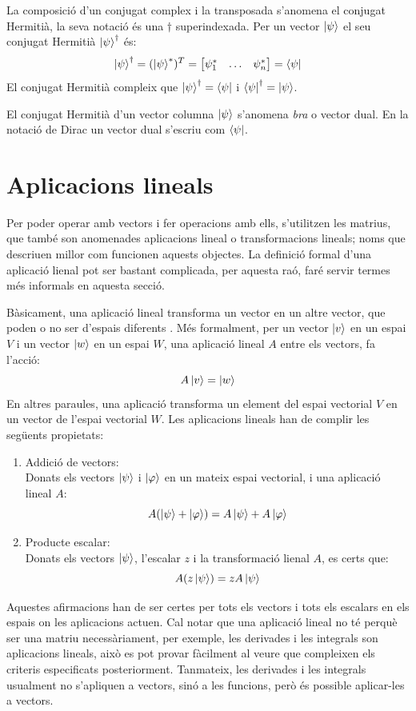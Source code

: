 La composició d'un conjugat complex i la transposada s'anomena el conjugat Hermitià, la seva notació és una $\dagger$ superindexada. Per un vector $\ket{\psi}$ el seu conjugat Hermitià $\ket{\psi}^\dagger$ és:
$$
\ket{\psi}^\dagger = (\ket{\psi}^*)^T =  \begin{bmatrix} \psi_{1}^* & \dots & \psi_{n}^* \end{bmatrix} = \bra{\psi}
$$
El conjugat Hermitià compleix que $\ket{\psi}^\dagger = \bra{\psi}$ i $\bra{\psi}^\dagger = \ket{\psi}$.

El conjugat Hermitià d'un vector columna $\ket{\psi}$ s'anomena \textit{bra} o vector dual. En la notació de Dirac un vector dual s'escriu com $\bra{\psi}$.

\section{Aplicacions lineals}
Per poder operar amb vectors i fer operacions amb ells, s'utilitzen les matrius, que també son anomenades aplicacions lineal o transformacions lineals; noms que descriuen millor com funcionen aquests objectes. La definició formal d'una aplicació lienal pot ser bastant complicada, per aquesta raó, faré servir termes més informals en aquesta secció. 

Bàsicament, una aplicació lineal transforma un vector en un altre vector, que poden o no ser d'espais diferents \cite{LR_done_right:linear_map}. Més formalment, per un vector $\ket{v}$ en un espai $V$ i un vector $\ket{w}$ en un espai $W$, una aplicació lineal $A$ entre els vectors, fa l'acció:
$$
A \ket{v} = \ket{w}
$$
En altres paraules, una aplicació transforma un element del espai vectorial $V$ en un vector de l'espai vectorial $W$.
Les aplicacions lineals han de complir les següents propietats:
\begin{enumerate}
	\item Addició de vectors: \\
	Donats els vectors $\ket{\psi}$ i $\ket{\varphi}$ en un mateix espai vectorial, i una aplicació lineal $A$:
	$$ A(\ket{\psi} + \ket{\varphi}) = A\ket{\psi} + A\ket{\varphi}$$ 
	\item Producte escalar:\\
	Donats els vectors $\ket{\psi}$, l'escalar $z$ i la transformació lienal $A$, es certs que:
	$$ A(z\ket{\psi}) = z A \ket{\psi}$$
\end{enumerate}

Aquestes afirmacions han de ser certes per tots els vectors i tots els escalars en els espais on les aplicacions actuen. Cal notar que una aplicació lineal no té perquè ser una matriu necessàriament, per exemple, les derivades i les integrals son aplicacions lineals, això es pot provar fàcilment al veure que compleixen els criteris especificats posteriorment. Tanmateix, les derivades i les integrals usualment no s'apliquen a vectors, sinó a les funcions, però és possible aplicar-les a vectors.


